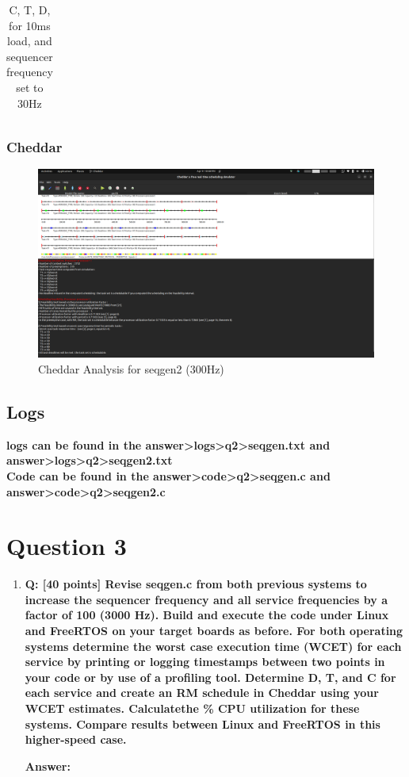 \documentclass[a4paper,11pt]{article}%
\newenvironment{qanda}{\setlength{\parindent}{0pt}}{\bigskip}
\newcommand{\Q}{\bigskip\bfseries Q: }
\newcommand{\A}{\par\textbf{Answer: } \normalfont}
\begin{document}
\begin{qanda}
\begin{enumerate}
\begin{table}[H]
\begin{tabular}{l c c c c}
					\hline\hline
				\end{tabular}
				\caption{C, T, D, for 10ms load, and sequencer frequency set to 30Hz}
			\end{table}

			\subsubsection{Cheddar}

			\begin{figure}[H]
				\centering
				\includegraphics[scale=0.25]{figures/seqgen2x.png}
				\caption{Cheddar Analysis for seqgen2 (300Hz)}
			\end{figure}

			\subsection{Logs}

			\textbf{logs can be found in the answer\textgreater logs\textgreater q2\textgreater seqgen.txt and answer\textgreater logs\textgreater q2\textgreater seqgen2.txt}\\
			\textbf{Code can be found in the answer\textgreater code\textgreater q2\textgreater seqgen.c and answer\textgreater code\textgreater q2\textgreater seqgen2.c}

	\end{enumerate}




	\section{Question 3}
	\begin{enumerate}
		\item[] \Q [40 points] Revise seqgen.c from both previous systems to increase the sequencer frequency
			and all service frequencies by a factor of 100 (3000 Hz). Build and execute the code under
			Linux and FreeRTOS on your target boards as before. For both operating systems determine
			the worst case execution time (WCET) for each service by printing or logging timestamps
			between two points in your code or by use of a profiling tool. Determine D, T, and C for
			each service and create an RM schedule in Cheddar using your WCET estimates. Calculatethe \% CPU utilization for these systems. Compare results between Linux and FreeRTOS in
			this higher-speed case.
			\A


\end{enumerate}
\end{qanda}
\end{document}
